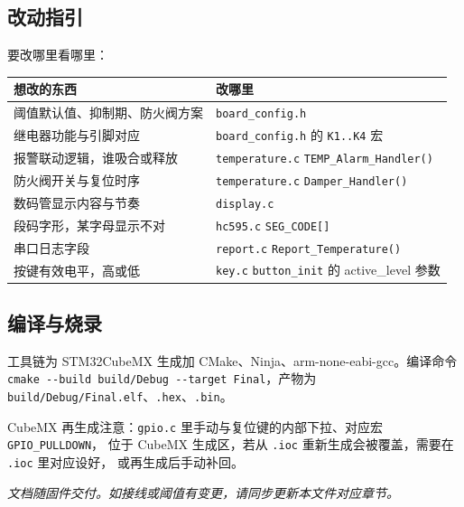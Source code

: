 \documentclass[a4paper,11pt]{ctexart}
\newenvironment{notebox}[1][red!7]{%
  \def\noteboxcolor{#1}%
  \par\smallskip\noindent
  \begin{lrbox}{\noteboxsave}%
  \begin{minipage}{\dimexpr\linewidth-2\fboxsep-2\fboxrule\relax}\small\setlength{\parskip}{2pt}}%
  {\end{minipage}\end{lrbox}%
  \fcolorbox{black!35}{\noteboxcolor}{\usebox{\noteboxsave}}\par\smallskip}
\begin{document}
\subsection{改动指引}
要改哪里看哪里：
\renewcommand{\arraystretch}{1.25}
\begin{center}
\begin{tabular}{|L{6.3cm}|L{7.3cm}|}
\hline
想改的东西 & 改哪里\\
\hline
阈值默认值、抑制期、防火阀方案 & \texttt{board\_config.h}\\
\hline
继电器功能与引脚对应 & \texttt{board\_config.h} 的 \texttt{K1..K4} 宏\\
\hline
报警联动逻辑，谁吸合或释放 & \texttt{temperature.c} \texttt{TEMP\_Alarm\_Handler()}\\
\hline
防火阀开关与复位时序 & \texttt{temperature.c} \texttt{Damper\_Handler()}\\
\hline
数码管显示内容与节奏 & \texttt{display.c}\\
\hline
段码字形，某字母显示不对 & \texttt{hc595.c} \texttt{SEG\_CODE[]}\\
\hline
串口日志字段 & \texttt{report.c} \texttt{Report\_Temperature()}\\
\hline
按键有效电平，高或低 & \texttt{key.c} \texttt{button\_init} 的 active\_level 参数\\
\hline
\end{tabular}
\end{center}
\renewcommand{\arraystretch}{1.0}

\subsection{编译与烧录}
工具链为 STM32CubeMX 生成加 CMake、Ninja、arm-none-eabi-gcc。编译命令
\texttt{cmake -{}-build build/Debug -{}-target Final}，产物为
\texttt{build/Debug/Final.elf}、\texttt{.hex}、\texttt{.bin}。
\begin{notebox}
CubeMX 再生成注意：\texttt{gpio.c} 里手动与复位键的内部下拉、对应宏 \texttt{GPIO\_PULLDOWN}，
位于 CubeMX 生成区，若从 \texttt{.ioc} 重新生成会被覆盖，需要在 \texttt{.ioc} 里对应设好，
或再生成后手动补回。
\end{notebox}

\vfill
\begin{center}\small\itshape
文档随固件交付。如接线或阈值有变更，请同步更新本文件对应章节。
\end{center}
\end{document}
